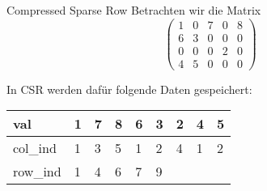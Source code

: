 \begin{example}{Compressed Sparse Row}
    Betrachten wir die Matrix
    \[
        \begin{pmatrix}
            1 & 0 & 7 & 0 & 8 \\
            6 & 3 & 0 & 0 & 0 \\
            0 & 0 & 0 & 2 & 0 \\
            4 & 5 & 0 & 0 & 0
        \end{pmatrix}
    \]

    In CSR werden dafür folgende Daten gespeichert:

    \begin{center}
        \begin{tabular}{|T|TTTTTTTT|}
            \hline
            val      & 1 & 7 & 8 & 6 & 3 & 2 & 4 & 5 \\
            \hline
            col\_ind & 1 & 3 & 5 & 1 & 2 & 4 & 1 & 2 \\
            \hline
            row\_ind & 1 & 4 & 6 & 7 & 9 &   &   &   \\
            \hline
        \end{tabular}
    \end{center}
\end{example}